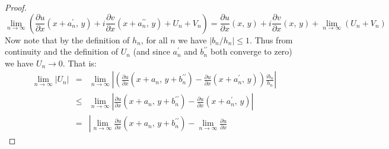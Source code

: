 \documentclass{article}
\theoremstyle{definition}
\begin{document}
\begin{proof}
            \begin{equation}
                \lim_{n\rightarrow\infty}
                \left(
                    \frac{\partial{u}}{\partial{x}}
                    (x+a_{n}^{\prime},\,y)
                    +i\frac{\partial{v}}{\partial{x}}
                    (x+a_{n}^{\prime\prime},\,y)
                    +U_{n}+V_{n}
                \right)
                =\frac{\partial{u}}{\partial{x}}(x,\,y)
                +i\frac{\partial{v}}{\partial{x}}(x,\,y)
                +\lim_{n\rightarrow\infty}\left(U_{n}+V_{n}\right)
            \end{equation}
            Now note that by the definition of $h_{n}$, for all $n$ we have
            $|b_{n}/h_{n}|\leq{1}$. Thus from continuity and the definition
            of $U_{n}$ (and since $a_{n}^{\prime}$ and $b_{n}^{\prime\prime}$
            both converge to zero) we have $U_{n}\rightarrow{0}$.
            That is:
            \begin{equation}
                \begin{array}{rcl}
                    \displaystyle
                    \lim_{n\rightarrow\infty}\left|U_{n}\right|
                    &=&
                    \displaystyle
                    \lim_{n\rightarrow\infty}
                    \left|
                        \left(
                            \frac{\partial{u}}{\partial{x}}
                            (x+a_{n},\,y+b_{n}^{\prime\prime})
                            -
                            \frac{\partial{u}}{\partial{x}}
                            (x+a_{n}^{\prime},\,y)
                        \right)
                        \frac{ib_{n}}{h_{n}}
                    \right|\\[2em]
                    &\leq&
                    \displaystyle
                    \lim_{n\rightarrow\infty}
                    \left|
                        \frac{\partial{u}}{\partial{x}}
                        (x+a_{n},\,y+b_{n}^{\prime\prime})
                        -
                        \frac{\partial{u}}{\partial{x}}
                        (x+a_{n}^{\prime},\,y)
                    \right|\\[2em]
                    &=&
                    \displaystyle
                    \left|
                        \lim_{n\rightarrow\infty}
                        \frac{\partial{u}}{\partial{x}}
                        (x+a_{n},\,y+b_{n}^{\prime\prime})
                        -
                        \lim_{n\rightarrow\infty}
                        \frac{\partial{u}}{\partial{x}}

\end{array}
\end{equation}
\end{proof}
\end{document}
